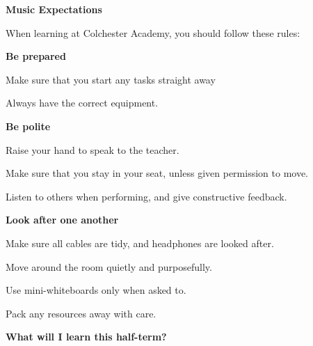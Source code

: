 \documentclass{article}
\begin{document}
\fontsize{14}{20}\selectfont

\begin{center}
    \fontsize{18}{22}\selectfont
    \textbf{Music Expectations}
\end{center}

\vspace{2em}

\noindent When learning at Colchester Academy, you should follow these rules:

\vspace{2em}

\noindent\textbf{Be prepared}
\vspace{0.5em}

\par \noindent Make sure that you start any tasks straight away
\par \noindent Always have the correct equipment.

\vspace{3em}

\noindent\textbf{Be polite}
\vspace{0.5em}

\par \noindent  Raise your hand to speak to the teacher.
\par \noindent  Make sure that you stay in your seat, unless given permission to move.
\par \noindent  Listen to others when performing, and give constructive feedback.

\vspace{3em}

\noindent\textbf{Look after one another}
\vspace{0.5em}
\par \noindent  Make sure all cables are tidy, and headphones are looked after.
\par \noindent  Move around the room quietly and purposefully.\
\par \noindent  Use mini-whiteboards only when asked to.
\par \noindent  Pack any resources away with care.
\newpage

\begin{center}
    \fontsize{18}{22}\selectfont
    \textbf{What will I learn this half-term?}
\end{center}
\end{document}
